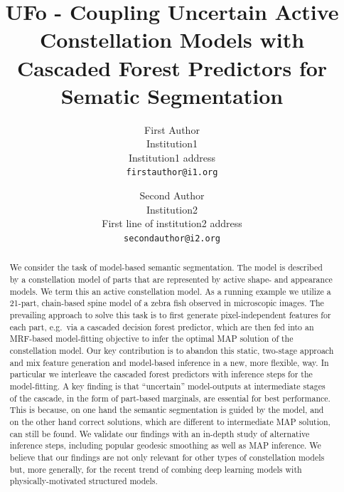 \documentclass[10pt,twocolumn,letterpaper]{article}
\begin{document}
\title{UFo - Coupling Uncertain Active Constellation Models with \\
Cascaded Forest Predictors for Sematic Segmentation}

\author{First Author\\
Institution1\\
Institution1 address\\
{\tt\small firstauthor@i1.org}
\and
Second Author\\
Institution2\\
First line of institution2 address\\
{\tt\small secondauthor@i2.org}
}

\maketitle

\begin{abstract}
We consider the task of model-based semantic segmentation. The model is described by a constellation model of parts that are represented by active shape- and appearance models. We term this an active constellation model. As a running example we utilize a 21-part, chain-based spine model of a zebra fish observed in microscopic images. The prevailing approach to solve this task is to first generate pixel-independent features for each part, e.g.\ via a cascaded decision forest predictor, which are then fed into an MRF-based model-fitting objective to infer the optimal MAP solution of the constellation model. Our key contribution is to abandon this static, two-stage approach and mix feature generation and model-based inference in a new, more flexible, way. In particular we interleave the cascaded forest predictors with inference steps for the model-fitting. A key finding is that “uncertain” model-outputs at intermediate stages of the cascade, in the form of part-based marginals, are essential for best performance. This is because, on one hand the semantic segmentation is guided by the model, and on the other hand correct solutions, which are different to intermediate MAP solution, can still be found. We validate our findings with an in-depth study of alternative inference steps, including popular geodesic smoothing as well as MAP inference. %
We believe that our findings are not only relevant for other types of constellation models but, more generally, for the recent trend of combing deep learning models with physically-motivated structured models. 
\end{abstract}
\end{document}
